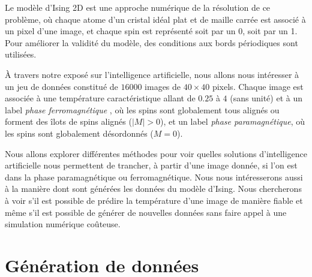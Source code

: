 \documentclass[11pt]{scrartcl} %
\begin{document}
Le modèle d'Ising 2D est une approche numérique de la résolution de ce problème, où chaque atome d'un cristal idéal plat et de maille carrée est associé à un pixel d'une image, et chaque spin est représenté soit par un 0, soit par un 1. Pour améliorer la validité du modèle, des conditions aux bords périodiques sont utilisées.


À travers notre exposé sur l'intelligence artificielle, nous allons nous intéresser à un jeu de données constitué de $16 000$ images de $40 \times 40$ pixels. Chaque image est associée à une température caractéristique allant de $0.25$ à $4$ (sans unité) et à un label \textit{phase ferromagnétique} , où les spins sont globalement tous alignés ou forment des îlots de spins alignés ($|M| > 0$), et un label \textit{phase paramagnétique}, où les spins sont globalement désordonnés ($M = 0$).


Nous allons explorer différentes méthodes pour voir quelles solutions d'intelligence artificielle nous permettent de trancher, à partir d'une image donnée, si l'on est dans la phase paramagnétique ou ferromagnétique. Nous nous intéresserons aussi à la manière dont sont générées les données du modèle d'Ising. Nous chercherons à voir s'il est possible de prédire la température d'une image de manière fiable et même s'il est possible de générer de nouvelles données sans faire appel à une simulation numérique coûteuse.

\section{Génération de données}
\end{document}
